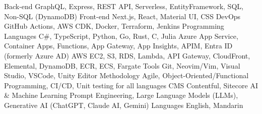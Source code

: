\begin{cvskills}
  \cvskill
    {Back-end} %
    {GraphQL, Express, REST API, Serverless, EntityFramework, SQL, Non-SQL (DynamoDB)} %
  \cvskill
    {Front-end} %
    {Next.js, React, Material UI, CSS} %
  \cvskill
    {DevOps} %
    {GitHub Actions, AWS CDK, Docker, Terraform, Jenkins} %
  \cvskill
    {Programming Languages} %
    {C\#, TypeScript, Python, Go, Rust, C, Julia} %
  \cvskill
    {Azure} %
    {App Service, Container Apps, Functions, App Gateway, App Insights, APIM, Entra ID (formerly Azure AD)} %
  \cvskill
    {AWS} %
    {EC2, S3, RDS, Lambda, API Gateway, CloudFront, Elemental, DynamoDB, ECR, ECS, Fargate} %
  \cvskill
    {Tools} %
    {Git, Neovim/Vim, Visual Studio, VSCode, Unity Editor} %
  \cvskill
    {Methodology} %
    {Agile, Object-Oriented/Functional Programming, CI/CD, Unit testing for all languages} %
  \cvskill
    {CMS} %
    {Contentful, Sitecore} %
  \cvskill
    {AI \& Machine Learning} %
    {Prompt Engineering, Large Language Models (LLMs), Generative AI (ChatGPT, Claude AI, Gemini)} %
  \cvskill
    {Languages} %
    {English, Mandarin} %
\end{cvskills}
